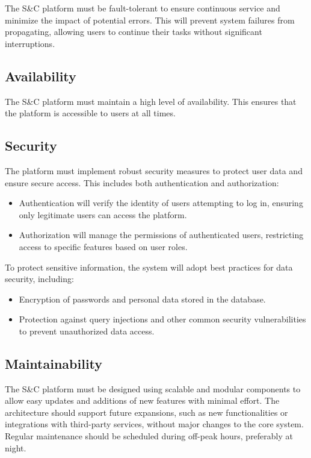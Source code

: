 The S\&C platform must be fault-tolerant to ensure continuous service
and minimize the impact of potential errors. This will prevent system
failures from propagating, allowing users to continue their tasks
without significant interruptions.


\subsection{Availability}
\label{subsec:availability}%


The S\&C platform must maintain a high level of availability. This
ensures that the platform is accessible to users at all times.


\subsection{Security}
\label{subsec:security}%


The platform must implement robust security measures to protect user
data and ensure secure access. This includes both authentication and
authorization:

\begin{itemize}
\item
  Authentication will verify the identity of users attempting to log in,
  ensuring only legitimate users can access the platform.
\item
  Authorization will manage the permissions of authenticated users,
  restricting access to specific features based on user roles.
\end{itemize}

\newpage

To protect sensitive information, the system will adopt best practices
for data security, including:

\begin{itemize}
\item
  Encryption of passwords and personal data stored in the database.
\item
  Protection against query injections and other common security
  vulnerabilities to prevent unauthorized data access.
\end{itemize}


\subsection{Maintainability}
\label{subsec:maintainability}%


The S\&C platform must be designed using scalable and modular components
to allow easy updates and additions of new features with minimal effort.
The architecture should support future expansions, such as new
functionalities or integrations with third-party services, without major
changes to the core system. Regular maintenance should be scheduled
during off-peak hours, preferably at night.


